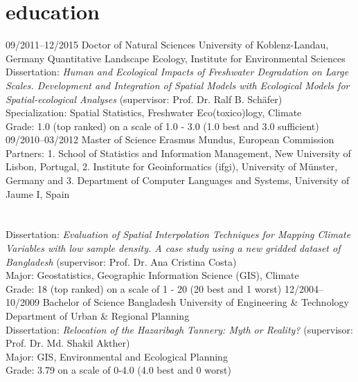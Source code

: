 \documentclass[]{friggeri-cv} %
\begin{document}
\section{education}

\begin{entrylist}
\entry
{\small{09/2011--12/2015}}
{Doctor of Natural Sciences}
{University of Koblenz-Landau, Germany}
{Quantitative Landscape Ecology, Institute for Environmental Sciences\\
Dissertation: {\emph{Human and Ecological Impacts of Freshwater Degradation on Large Scales. Development and Integration of Spatial Models with Ecological Models for Spatial-ecological Analyses} (supervisor: Prof. Dr. Ralf B. Sch\"afer)} \\
Specialization: Spatial Statistics, Freshwater Eco(toxico)logy, Climate\\
Grade: 1.0 (top ranked) on a scale of 1.0 - 3.0 (1.0 best and 3.0 sufficient)}
\entry
{\small{09/2010--03/2012}}
{Master of Science {}}
{Erasmus Mundus, European Commission}
{Partners: 1. School of Statistics and Information Management, New University of Lisbon, Portugal, 2. Institute for Geoinformatics (ifgi), University of M\"unster, Germany and 3. Department of Computer Languages and Systems, University of Jaume I, Spain}
\end{entrylist}
\section{}
\begin{entrylist}
\entry
{}
{}
{}
{Dissertation: {\emph{Evaluation of Spatial Interpolation Techniques for Mapping Climate Variables with low sample density. A case study using a new gridded dataset of Bangladesh} (supervisor: Prof. Dr. Ana Cristina Costa)} \\
Major: Geostatistics, Geographic Information Science (GIS), Climate \\
Grade: 18 (top ranked) on a scale of 1 - 20 (20 best and 1 worst)}
\entry
{\small{12/2004--10/2009}}
{Bachelor of Science {}}
{\scriptsize{Bangladesh University of Engineering \& Technology}}
{Department of Urban \& Regional Planning\\
Dissertation: {\emph{Relocation of the Hazaribagh Tannery: Myth or Reality?} (supervisor: Prof. Dr. Md. Shakil Akther)}\\
Major: GIS, Environmental and Ecological Planning \\
Grade: 3.79 on a scale of 0-4.0 (4.0 best and 0 worst)}
\end{entrylist}
\end{document}
